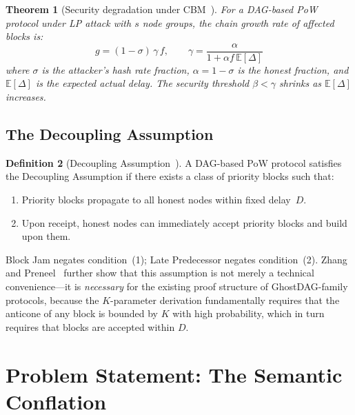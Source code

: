 \documentclass[11pt]{article}
\theoremstyle{definition}
\newtheorem{definition}{Definition}[section]
\theoremstyle{plain}
\newtheorem{theorem}[definition]{Theorem}
\theoremstyle{remark}
\begin{document}
\begin{theorem}[Security degradation under CBM~{\cite{wu2024security}}]\label{thm:cbm}
For a DAG-based PoW protocol under LP attack with $s$ node groups, the chain
growth rate of affected blocks is:
\begin{equation}\label{eq:chain_growth_cbm}
g = (1 - \sigma)\,\gamma\,f, \qquad
\gamma = \frac{\alpha}{1 + \alpha f\,\mathbb{E}[\Delta]}
\end{equation}
where $\sigma$ is the attacker's hash rate fraction, $\alpha = 1 - \sigma$ is
the honest fraction, and $\mathbb{E}[\Delta]$ is the expected actual delay.
The security threshold $\beta < \gamma$ shrinks as $\mathbb{E}[\Delta]$
increases.
\end{theorem}

\subsection{The Decoupling Assumption}

\begin{definition}[Decoupling Assumption~{\cite{wu2024security}}]\label{def:decoupling}
A DAG-based PoW protocol satisfies the Decoupling Assumption if there exists a
class of priority blocks such that:
\begin{enumerate}[nosep]
    \item Priority blocks propagate to all honest nodes within fixed delay~$D$.
    \item Upon receipt, honest nodes can immediately accept priority blocks and
    build upon them.
\end{enumerate}
\end{definition}

\noindent Block Jam negates condition~(1); Late Predecessor negates
condition~(2).  Zhang and Preneel~\cite{zhang2019common} further show that this
assumption is not merely a technical convenience---it is \emph{necessary} for
the existing proof structure of GhostDAG-family protocols, because the
$K$-parameter derivation fundamentally requires that the anticone of any block
is bounded by $K$ with high probability, which in turn requires that blocks are
accepted within $D$.

\section{Problem Statement: The Semantic Conflation}\label{sec:problem}
\end{document}

